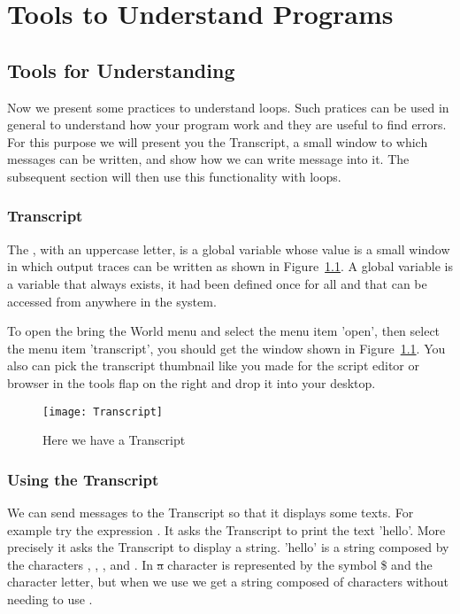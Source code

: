\ifx\wholebook\relax\else



\fi

\chapter{Tools to Understand Programs}\label{ch:loopvar}







\section{Tools for Understanding}
Now we present some practices to understand loops. Such pratices can be used in general to understand how your program work and they are useful to find errors.  For this purpose we will present you the Transcript, a small window to which messages can be written, and show how we can write message into it. The subsequent section will then use this functionality with loops.

\subsection{Transcript}
The , with an uppercase letter, is a global variable
whose value is a small window in which output traces can be written as shown in Figure~\ref{fig:transcript}. A global variable is a variable that always exists, it had been defined once for all and that can be accessed from anywhere in the system. 

To open the  bring the World menu and select the menu item 'open', then select the menu item 'transcript', you should get the window
shown in Figure~\ref{fig:transcript}.  You also can pick
the transcript thumbnail like you made for the script editor or browser in the tools flap on the right and drop it into your desktop.

\begin{figure}[!htbp]
\centerline{\texttt{[image: Transcript]}}
\caption{Here we have a Transcript}
\label{fig:transcript}
\end{figure}


\subsection{Using the Transcript}
We can send messages to the Transcript so that it
displays some texts. For example try the expression . It asks the Transcript to print the text 'hello'. More
precisely it asks the Transcript to display a string. 'hello' is a string composed by the characters , , ,  and . In \st a character is represented by the symbol \$ and the
character letter, but when we use  we get a string composed of characters without needing to use \ct{\$}. 

